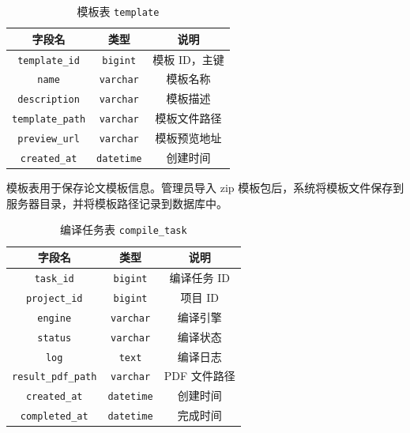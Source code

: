 \documentclass{xduugthesis}
\begin{document}
\begin{table}[!ht]
    \centering
    \caption{模板表 \texttt{template}}
    \label{tab:template}
    \begin{tabular}{|c|c|c|}
        \hline
        \textbf{字段名} & \textbf{类型} & \textbf{说明} \\ \hline
        \texttt{template\_id} & \texttt{bigint} & 模板 ID，主键 \\ \hline
        \texttt{name} & \texttt{varchar} & 模板名称 \\ \hline
        \texttt{description} & \texttt{varchar} & 模板描述 \\ \hline
        \texttt{template\_path} & \texttt{varchar} & 模板文件路径 \\ \hline
        \texttt{preview\_url} & \texttt{varchar} & 模板预览地址 \\ \hline
        \texttt{created\_at} & \texttt{datetime} & 创建时间 \\ \hline
    \end{tabular}
\end{table}

模板表用于保存论文模板信息。管理员导入 zip 模板包后，系统将模板文件保存到服务器目录，并将模板路径记录到数据库中。

\begin{table}[!ht]
    \centering
    \caption{编译任务表 \texttt{compile\_task}}
    \label{tab:compile-task}
    \begin{tabular}{|c|c|c|}
        \hline
        \textbf{字段名} & \textbf{类型} & \textbf{说明} \\ \hline
        \texttt{task\_id} & \texttt{bigint} & 编译任务 ID \\ \hline
        \texttt{project\_id} & \texttt{bigint} & 项目 ID \\ \hline
        \texttt{engine} & \texttt{varchar} & 编译引擎 \\ \hline
        \texttt{status} & \texttt{varchar} & 编译状态 \\ \hline
        \texttt{log} & \texttt{text} & 编译日志 \\ \hline
        \texttt{result\_pdf\_path} & \texttt{varchar} & PDF 文件路径 \\ \hline
        \texttt{created\_at} & \texttt{datetime} & 创建时间 \\ \hline
        \texttt{completed\_at} & \texttt{datetime} & 完成时间 \\ \hline
    \end{tabular}
\end{table}
\end{document}
